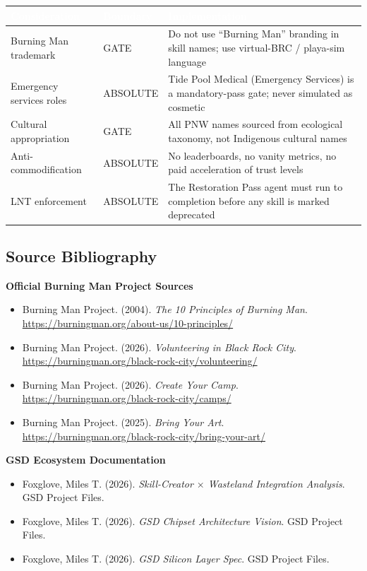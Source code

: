 \documentclass[11pt,letterpaper]{article}
\newcommand{\tableheader}[1]{\textbf{\sffamily\textcolor{white}{#1}}}
\begin{document}
\begin{center}
\begin{tabularx}{\textwidth}{L{4cm}L{2cm}X}
\toprule
{}
\tableheader{Consideration} & \tableheader{Boundary} & \tableheader{Implementation} \\
\midrule
Burning Man trademark & GATE & Do not use ``Burning Man'' branding in skill names; use virtual-BRC / playa-sim language \\
Emergency services roles & ABSOLUTE & Tide Pool Medical (Emergency Services) is a mandatory-pass gate; never simulated as cosmetic \\
Cultural appropriation & GATE & All PNW names sourced from ecological taxonomy, not Indigenous cultural names \\
Anti-commodification & ABSOLUTE & No leaderboards, no vanity metrics, no paid acceleration of trust levels \\
LNT enforcement & ABSOLUTE & The Restoration Pass agent must run to completion before any skill is marked deprecated \\
\bottomrule
\end{tabularx}
\end{center}

\subsection{Source Bibliography}

\textbf{Official Burning Man Project Sources}
\begin{itemize}[noitemsep]
  \item Burning Man Project. (2004). \textit{The 10 Principles of Burning Man}. \url{https://burningman.org/about-us/10-principles/}
  \item Burning Man Project. (2026). \textit{Volunteering in Black Rock City}. \url{https://burningman.org/black-rock-city/volunteering/}
  \item Burning Man Project. (2026). \textit{Create Your Camp}. \url{https://burningman.org/black-rock-city/camps/}
  \item Burning Man Project. (2025). \textit{Bring Your Art}. \url{https://burningman.org/black-rock-city/bring-your-art/}
\end{itemize}

\textbf{GSD Ecosystem Documentation}
\begin{itemize}[noitemsep]
  \item Foxglove, Miles T. (2026). \textit{Skill-Creator $\times$ Wasteland Integration Analysis}. GSD Project Files.
  \item Foxglove, Miles T. (2026). \textit{GSD Chipset Architecture Vision}. GSD Project Files.
  \item Foxglove, Miles T. (2026). \textit{GSD Silicon Layer Spec}. GSD Project Files.
\end{itemize}
\end{document}
